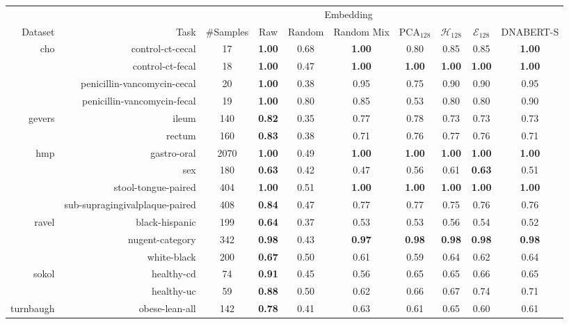 \begin{tabular}{rrcccccccc}
\toprule
& & \multicolumn{7}{c}{Embedding} \\
Dataset& Task& \#Samples& Raw& Random & Random Mix &  PCA$_{128}$& $\mathcal{H}_{128}$& $\mathcal{E}_{128}$& DNABERT-S\\
\midrule
\multirow{4}{*}{cho}
& control-ct-cecal & 17 & \textbf{1.00} & 0.68 & \textbf{1.00} & 0.80 & 0.85 & 0.85 & \textbf{1.00} \\
& control-ct-fecal & 18 & \textbf{1.00} & 0.47 & \textbf{1.00} & \textbf{1.00} & \textbf{1.00} & \textbf{1.00} & \textbf{1.00} \\
& penicillin-vancomycin-cecal & 20 & \textbf{1.00} & 0.38 & 0.95 & 0.75 & 0.90 & 0.90 & 0.95 \\
& penicillin-vancomycin-fecal & 19 & \textbf{1.00} & 0.80 & 0.85 & 0.53 & 0.80 & 0.80 & 0.90 \\
\midrule
\multirow{2}{*}{gevers}
& ileum & 140 & \textbf{0.82} & 0.35 & 0.77 & 0.78 & 0.73 & 0.73 & 0.73 \\
& rectum & 160 & \textbf{0.83} & 0.38 & 0.71 & 0.76 & 0.77 & 0.76 & 0.71 \\
\midrule
\multirow{4}{*}{hmp}
& gastro-oral & 2070 & \textbf{1.00} & 0.49 & \textbf{1.00} & \textbf{1.00} & \textbf{1.00} & \textbf{1.00} & \textbf{1.00} \\
& sex & 180 & \textbf{0.63} & 0.42 & 0.47 & 0.56 & 0.61 & \textbf{0.63} & 0.51 \\
& stool-tongue-paired & 404 & \textbf{1.00} & 0.51 & \textbf{1.00} & \textbf{1.00} & \textbf{1.00} & \textbf{1.00} & \textbf{1.00} \\
& sub-supragingivalplaque-paired & 408 & \textbf{0.84} & 0.47 & 0.77 & 0.77 & 0.75 & 0.76 & 0.76 \\
\midrule
\multirow{3}{*}{ravel}
& black-hispanic & 199 & \textbf{0.64} & 0.37 & 0.53 & 0.53 & 0.56 & 0.54 & 0.52 \\
& nugent-category & 342 & \textbf{0.98} & 0.43 & \textbf{0.97} & \textbf{0.98} & \textbf{0.98} & \textbf{0.98} & \textbf{0.98} \\
& white-black & 200 & \textbf{0.67} & 0.50 & 0.61 & 0.59 & 0.64 & 0.62 & 0.64 \\
\midrule
\multirow{2}{*}{sokol}
& healthy-cd & 74 & \textbf{0.91} & 0.45 & 0.56 & 0.65 & 0.65 & 0.66 & 0.65 \\
& healthy-uc & 59 & \textbf{0.88} & 0.50 & 0.62 & 0.66 & 0.67 & 0.74 & 0.71 \\
\midrule
\multirow{1}{*}{turnbaugh}
& obese-lean-all & 142 & \textbf{0.78} & 0.41 & 0.63 & 0.61 & 0.65 & 0.60 & 0.61 \\

\end{tabular}
